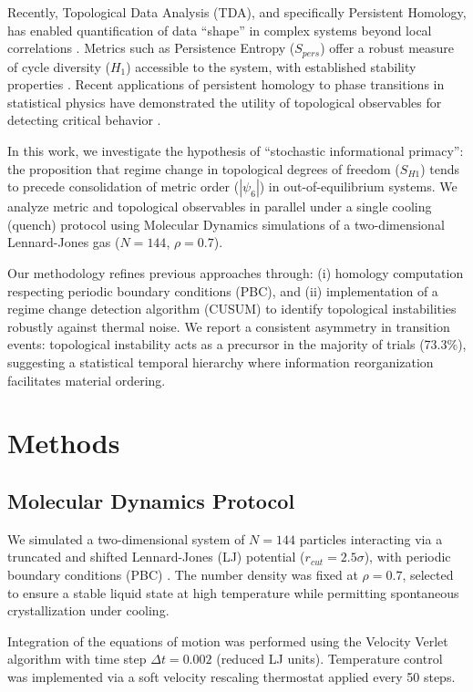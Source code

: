 \documentclass[twocolumn,showpacs,preprintnumbers,amsmath,amssymb,prb,floatfix]{revtex4-2}
\begin{document}
Recently, Topological Data Analysis (TDA), and specifically Persistent Homology, has enabled quantification of data ``shape'' in complex systems beyond local correlations \cite{edelsbrunner2010,carlsson2009,leykam2023}. Metrics such as Persistence Entropy ($S_{pers}$) offer a robust measure of cycle diversity ($H_1$) accessible to the system, with established stability properties \cite{atienza2020}. Recent applications of persistent homology to phase transitions in statistical physics have demonstrated the utility of topological observables for detecting critical behavior \cite{sale2022}.

In this work, we investigate the hypothesis of ``stochastic informational primacy'': the proposition that regime change in topological degrees of freedom ($S_{H1}$) tends to precede consolidation of metric order ($|\psi_6|$) in out-of-equilibrium systems. We analyze metric and topological observables in parallel under a single cooling (quench) protocol using Molecular Dynamics simulations of a two-dimensional Lennard-Jones gas ($N=144$, $\rho=0.7$).

Our methodology refines previous approaches through: (i) homology computation respecting periodic boundary conditions (PBC), and (ii) implementation of a regime change detection algorithm (CUSUM) to identify topological instabilities robustly against thermal noise. We report a consistent asymmetry in transition events: topological instability acts as a precursor in the majority of trials (73.3\%), suggesting a statistical temporal hierarchy where information reorganization facilitates material ordering.

\section{Methods}

\subsection{Molecular Dynamics Protocol}

We simulated a two-dimensional system of $N=144$ particles interacting via a truncated and shifted Lennard-Jones (LJ) potential ($r_{cut}=2.5\sigma$), with periodic boundary conditions (PBC) \cite{wierschem2011}. The number density was fixed at $\rho=0.7$, selected to ensure a stable liquid state at high temperature while permitting spontaneous crystallization under cooling.

Integration of the equations of motion was performed using the Velocity Verlet algorithm with time step $\Delta t = 0.002$ (reduced LJ units). Temperature control was implemented via a soft velocity rescaling thermostat applied every 50 steps.
\end{document}
